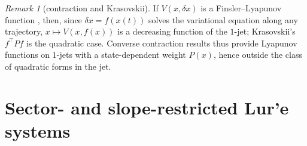 \documentclass[preprint,12pt,authoryear]{elsarticle}
\theoremstyle{definition}
\theoremstyle{remark}
\newtheorem{remark}[theorem]{Remark}
\newcommand{\tr}{^{\top}}
\begin{document}
\begin{remark}[contraction and Krasovskii]
If $V(x,\delta x)$ is a Finsler--Lyapunov function \citep{ForniSepulchre2014}, then, since $\delta x=f(x(t))$ solves the variational equation along any trajectory, $x\mapsto V(x,f(x))$ is a decreasing function of the $1$-jet; Krasovskii's $f\tr Pf$ is the quadratic case. Converse contraction results \citep{AndrieuJP2016} thus provide Lyapunov functions on $1$-jets with a state-dependent weight $P(x)$, hence outside the class of quadratic forms in the jet.
\end{remark}

\section{Sector- and slope-restricted Lur'e systems}\label{sec:lure}
\end{document}
